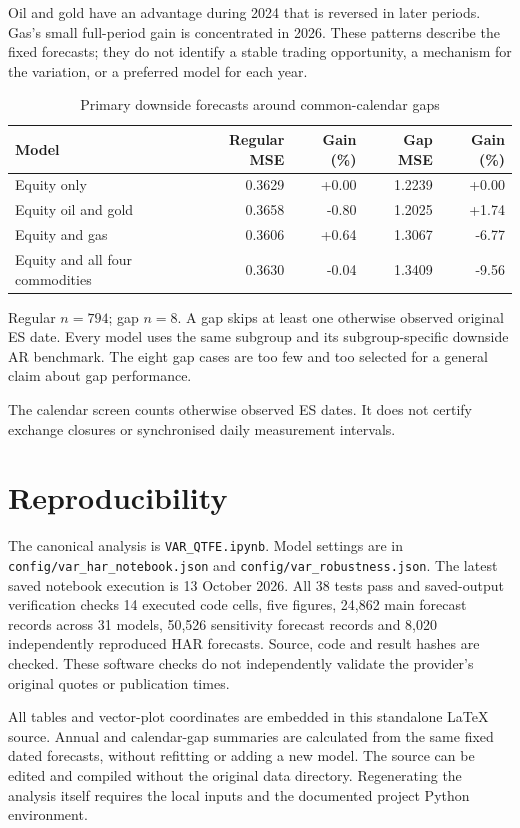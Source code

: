 \documentclass[11pt,letterpaper]{article}
\newcommand{\sourcefile}[1]{\texttt{\small #1}}
\begin{document}
Oil and gold have an advantage during 2024 that is reversed in later periods.
Gas's small full-period gain is concentrated in 2026. These patterns describe
the fixed forecasts; they do not identify a stable trading opportunity, a mechanism
for the variation, or a preferred model for each year.

\begin{table}[H]
\centering
\caption{Primary downside forecasts around common-calendar gaps}\label{tab:gaps}
\footnotesize
\begin{tabular}{p{2.65in}rrrr}
\toprule
Model & Regular MSE & Gain (\%) & Gap MSE & Gain (\%) \\
\midrule
Equity only & 0.3629 & +0.00 & 1.2239 & +0.00 \\
Equity oil and gold & 0.3658 & -0.80 & 1.2025 & +1.74 \\
Equity and gas & 0.3606 & +0.64 & 1.3067 & -6.77 \\
Equity and all four commodities & 0.3630 & -0.04 & 1.3409 & -9.56 \\
\bottomrule
\end{tabular}
\end{table}
{\footnotesize Regular $n=794$; gap $n=8$. A gap skips at least one otherwise observed original ES date. Every model uses the same subgroup and its subgroup-specific downside AR benchmark. The eight gap cases are too few and too selected for a general claim about gap performance.\par}


The calendar screen counts otherwise observed ES dates. It does not certify
exchange closures or synchronised daily measurement intervals.

\clearpage
\section*{Reproducibility}
The canonical analysis is \sourcefile{VAR\_QTFE.ipynb}. Model settings are in
\sourcefile{config/var\_har\_notebook.json} and
\sourcefile{config/var\_robustness.json}. The latest saved notebook execution is
13 October 2026. All 38 tests pass and saved-output verification
checks 14 executed code cells, five figures, 24,862 main forecast records across
31 models, 50,526 sensitivity forecast records and 8,020 independently reproduced
HAR forecasts. Source, code and result hashes are checked. These software checks
do not independently validate the provider's original quotes or publication times.

All tables and vector-plot coordinates are embedded in this standalone LaTeX
source. Annual and calendar-gap summaries are calculated from the same fixed
dated forecasts, without refitting or adding a new model. The source can be edited
and compiled without the original data directory. Regenerating the analysis itself
requires the local inputs and the documented project Python environment.
\end{document}
